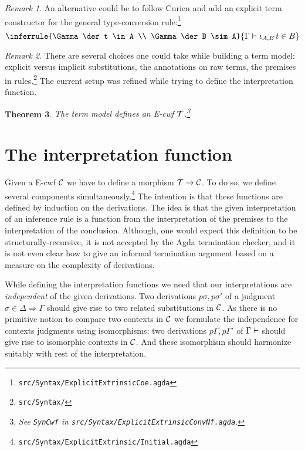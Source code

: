 \documentclass{amsart}
\theoremstyle{plain}
\newtheorem{theorem}{Theorem}
\theoremstyle{definition}
\theoremstyle{remark}
\newtheorem{remark}[theorem]{Remark}
\begin{document}
\begin{remark}
  An alternative could be to follow Curien and add an explicit term
  constructor for the general type-conversion
  rule:\footnote{\texttt{src/Syntax/ExplicitExtrinsicCoe.agda}}
  \[
    \inferrule {\Gamma \der t \in A \\ \Gamma \der B \sim A}
    {\Gamma \der \iota_{A,B}\,t \in B}
  \]
\end{remark}

\begin{remark}
  There are several choices one could take while building a term
  model: explicit versus implicit substitutions, the annotations on
  raw terms, the premises in rules.\footnote{\texttt{src/Syntax/}} The
  current setup was refined while trying to define the interpretation
  function.
\end{remark}

\begin{theorem}
  The term model defines an E-cwf $\mathcal{T}$.\footnote{See \texttt{SynCwf}
    in \texttt{src/Syntax/ExplicitExtrinsicConvNf.agda}.}
\end{theorem}


\section{The interpretation function}
\label{sec:interpretation}

Given a E-cwf $\mathcal{C}$ we have to define a morphism $\mathcal{T} \to \mathcal{C}$.  To do
so, we define several components
simultaneously.\footnote{\texttt{src/Syntax/ExplicitExtrinsic/Initial.agda}}
The intention is that these functions are defined by induction on the
derivations.  The idea is that the given interpretation of an
inference rule is a function from the interpretation of the premises
to the interpretation of the conclusion.  Although, one would expect
this definition to be structurally-recursive, it is not accepted by
the Agda termination checker, and it is not even clear how to give an
informal termination argument based on a measure on the complexity of
derivations.

While defining the interpretation functions we need that our
interpretations are \emph{independent} of the given derivations.  Two
derivations $p\sigma, p\sigma'$ of a judgment $\sigma \in \Delta
\Rightarrow \Gamma$ should give rise to two related substitutions in
$\mathcal{C}$.  As there is no primitive notion to compare two contexts in $\mathcal{C}$
we formulate the independence for contexts judgments using
isomorphisms: two derivations $p\Gamma, p\Gamma'$ of $\Gamma \vdash$
should give rise to isomorphic contexts in $\mathcal{C}$.  And these
isomorphism should harmonize suitably with rest of the interpretation.
\end{document}
